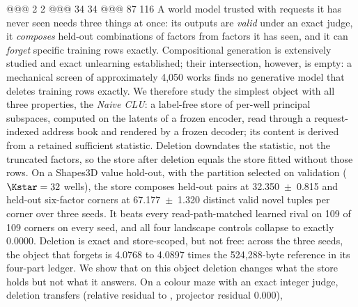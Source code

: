 @@@ 2 2
@@@ 34 34
@@@ 87 116
A world model trusted with requests it has never seen needs three things at once: its outputs are \emph{valid} under an exact judge, it \emph{composes}
held-out combinations of factors from factors it has seen, and it can \emph{forget} specific
training rows exactly. Compositional generation is extensively studied and exact unlearning established; their intersection, however, is empty: a mechanical
screen of approximately 4,050 works finds no generative model that deletes training rows
exactly. %
We therefore study the simplest object with all three properties, the \emph{Naive CLU}: a
label-free store of per-well principal subspaces, computed on the latents of a frozen
encoder, read through a request-indexed address book and rendered by a frozen decoder; its
content is derived from a retained sufficient statistic. Deletion downdates the statistic, not the truncated factors, so the store after deletion equals the store fitted without those rows.
On a Shapes3D value hold-out, with the partition selected on validation ($\Kstar=32$ wells),
the store composes held-out pairs at 32.350~$\pm$~0.815 and held-out six-factor corners at
67.177~$\pm$~1.320 distinct valid novel tuples per corner over three seeds. It beats every
read-path-matched learned rival on 109 of 109 corners on every seed, and all four landscape
controls collapse to exactly 0.0000. %
Deletion is exact and store-scoped, but not free: across the three seeds, the object
that forgets is 4.0768 to 4.0897 times the 524,288-byte reference in its four-part ledger. We show that on this object deletion changes what the store holds but not what it answers.
On a colour maze with an exact integer judge, deletion transfers
(relative residual  to , projector residual 0.000), %
